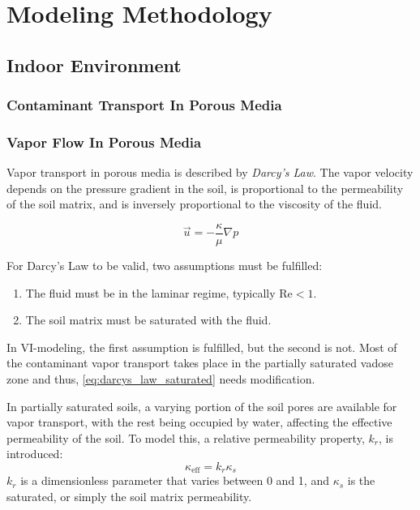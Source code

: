 \documentclass[../main.tex]{subfiles}
\begin{document}
\chapter{Modeling Methodology}

\section{Indoor Environment}

\subsection{Contaminant Transport In Porous Media}


\subsection{Vapor Flow In Porous Media}

Vapor transport in porous media is described by \textit{Darcy's Law}.
The vapor velocity depends on the pressure gradient in the soil, is proportional to the permeability of the soil matrix, and is inversely proportional to the viscosity of the fluid.

\begin{equation}\label{eq:darcys_law_saturated}
  \vec{u} = -\frac{\kappa}{\mu}\nabla p
\end{equation}

For Darcy's Law to be valid, two assumptions must be fulfilled:
\begin{enumerate}
  \item The fluid must be in the laminar regime, typically $\mathrm{Re} < 1$.
  \item The soil matrix must be saturated with the fluid.
\end{enumerate}
In VI-modeling, the first assumption is fulfilled, but the second is not.
Most of the contaminant vapor transport takes place in the partially saturated vadose zone and thus, \eqref{eq:darcys_law_saturated} needs modification.

In partially saturated soils, a varying portion of the soil pores are available for vapor transport, with the rest being occupied by water, affecting the effective permeability of the soil.
To model this, a relative permeability property, $k_r$, is introduced:
\begin{equation}
  \kappa_\mathrm{eff} = k_r \kappa_s
\end{equation}
$k_r$ is a dimensionless parameter that varies between 0 and 1, and $\kappa_s$ is the saturated, or simply the soil matrix permeability.
\end{document}
